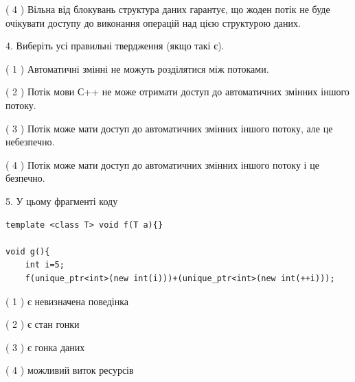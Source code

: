 \documentclass[12pt, ukrainian]{article}
\begin{document}
\begin {large}
{( 4 ) Вільна від блокувань структура даних гарантує, що жоден потік не буде очікувати доступу до виконання операцій над цією структурою даних.%


4. Виберіть усі правильні твердження (якщо такі є).\par
\vspace{2mm}

( 1 ) Автоматичні змінні не можуть розділятися між потоками.%

( 2 ) Потік мови С++ не може отримати доступ до автоматичних змінних іншого потоку.%

( 3 ) Потік може мати доступ до автоматичних змінних іншого потоку, але це небезпечно.%

( 4 ) Потік може мати доступ до автоматичних змінних іншого потоку і це безпечно.%


5. У цьому фрагменті коду
\begin{verbatim}
template <class T> void f(T a){}

void g(){
    int i=5;
    f(unique_ptr<int>(new int(i)))+(unique_ptr<int>(new int(++i)));
\end{verbatim}
( 1 ) є невизначена поведінка%

( 2 ) є стан гонки%

( 3 ) є гонка даних%

( 4 ) можливий виток ресурсів%
}
\end {large}
\end{document}
